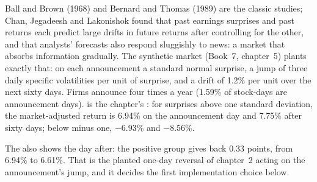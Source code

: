 Ball and Brown (1968) and Bernard and Thomas (1989) are the classic studies; Chan, Jegadeesh and Lakonishok found that past earnings surprises and past
returns each predict large drifts in future returns after controlling for the other, and that analysts' forecasts also respond sluggishly to news: a market
that absorbs information gradually. The synthetic market (Book~7, chapter~5) plants exactly that: on each announcement a standard normal surprise, a jump of
three daily specific volatilities per unit of surprise, and a drift of 1.2\% per unit over the next sixty days. Firms announce four times a year (1.59\% of
stock-days are announcement days).  is the chapter's : for surprises above one standard deviation, the
market-adjusted return is 6.94\% on the announcement day and 7.75\% after sixty days; below minus one, $-6.93\%$ and $-8.56\%$.

\begin{omfigure}

\label{fig:s1:earnings:car}
\end{omfigure}

The  also shows the day after: the positive group gives back 0.33 points, from 6.94\% to 6.61\%. That is the planted one-day reversal of
chapter~2 acting on the announcement's jump, and it decides the first implementation choice below.

